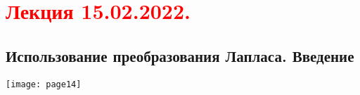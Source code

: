 \documentclass[main.tex]{subfiles}
\begin{document}
\section{\textcolor{red}{Лекция 15.02.2022.}}

\subsection{Использование преобразования Лапласа. Введение}
\texttt{[image: page14]}









\end{document}
